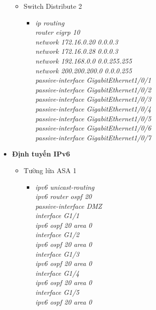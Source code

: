 \documentclass[12pt,a4paper]{report}
\begin{document}
\begin{itemize}
\begin{itemize}
\begin{itemize}
          \end{itemize}
             \item Switch Distribute 2
        \begin{itemize}
         \item \textit{ip routing\\
router eigrp 10\\
network 172.16.0.20 0.0.0.3\\
network 172.16.0.28 0.0.0.3\\
network 192.168.0.0 0.0.255.255\\
network 200.200.200.0 0.0.0.255\\
passive-interface GigabitEthernet1/0/1\\
passive-interface GigabitEthernet1/0/2 \\
passive-interface GigabitEthernet1/0/3 \\
passive-interface GigabitEthernet1/0/4 \\
passive-interface GigabitEthernet1/0/5 \\
passive-interface GigabitEthernet1/0/6 \\
passive-interface GigabitEthernet1/0/7\\}
         
          \end{itemize}
       \end{itemize}
     
       \item \textbf{Định tuyến IPv6}
      \begin{itemize}
        \item Tường lửa ASA 1
        \begin{itemize}
          \item \textit{ipv6 unicast-routing\\
ipv6 router ospf 20\\
passive-interface DMZ\\
interface G1/1\\
ipv6 ospf 20 area 0\\
interface G1/2\\
ipv6 ospf 20 area 0\\
interface G1/3\\
ipv6 ospf 20 area 0\\
interface G1/4\\
ipv6 ospf 20 area 0\\
interface G1/5\\
ipv6 ospf 20 area 0\\}
       

\end{itemize}
\end{itemize}
\end{itemize}
\end{document}
